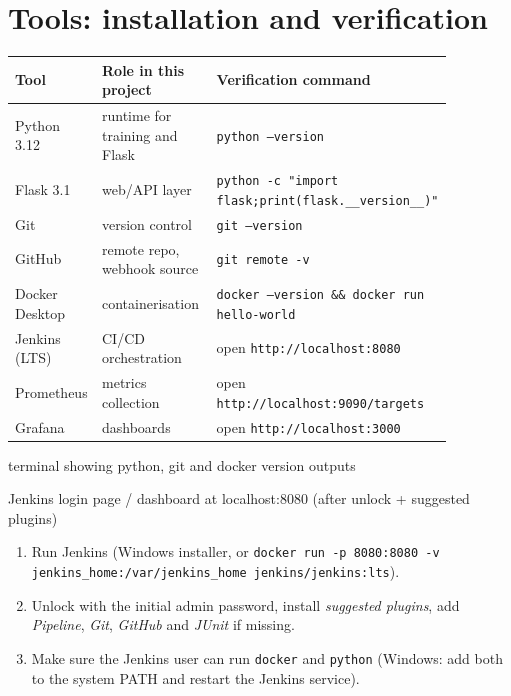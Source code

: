 \documentclass[10pt,a4paper]{article}
\let\oldsection\section
\renewcommand{\section}{\Needspace{14\baselineskip}\oldsection}
\begin{document}
\section{Tools: installation and verification}
\begin{center}
\small
\begin{tabular}{@{}p{0.16\linewidth}p{0.26\linewidth}p{0.45\linewidth}@{}}
\toprule
\textbf{Tool} & \textbf{Role in this project} & \textbf{Verification command}\\
\midrule
Python 3.12 & runtime for training and Flask & \texttt{python --version}\\
Flask 3.1 & web/API layer & \texttt{python -c "import flask;print(flask.\_\_version\_\_)"}\\
Git & version control & \texttt{git --version}\\
GitHub & remote repo, webhook source & \texttt{git remote -v}\\
Docker Desktop & containerisation & \texttt{docker --version \&\& docker run hello-world}\\
Jenkins (LTS) & CI/CD orchestration & open \texttt{http://localhost:8080}\\
Prometheus & metrics collection & open \texttt{http://localhost:9090/targets}\\
Grafana & dashboards & open \texttt{http://localhost:3000}\\
\bottomrule
\end{tabular}
\end{center}

\begin{shot}{terminal showing python, git and docker version outputs}\end{shot}
\vspace{4pt}
\begin{shot}{Jenkins login page / dashboard at localhost:8080 (after unlock + suggested plugins)}\end{shot}

\begin{note}
\begin{enumerate}[leftmargin=14pt]
\item Run Jenkins (Windows installer, or \texttt{docker run -p 8080:8080 -v jenkins\_home:/var/jenkins\_home jenkins/jenkins:lts}).
\item Unlock with the initial admin password, install \emph{suggested plugins}, add \emph{Pipeline}, \emph{Git}, \emph{GitHub} and \emph{JUnit} if missing.
\item Make sure the Jenkins user can run \texttt{docker} and \texttt{python} (Windows: add both to the system PATH and restart the Jenkins service).
\end{enumerate}
\end{note}
\end{document}
